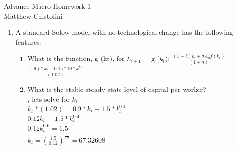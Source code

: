 \documentclass[12pt,oneside,reqno]{amsart}
\begin{document}
\begin{center}
    \Huge{Advance Macro Homework 1}\\
    \large{Matthew Chistolini}
\end{center}
\vspace{-.3cm}
\begin{enumerate}
    \item A standard Solow model with no technological change has the following features:
    \begin{enumerate}
        \item What is the function, g (kt), for $k_{t+1}$ = g ($k_t$): $\frac{(1-\delta)k_t+\sigma A_0 f(k_t)}{(1+n)}$ = $\frac{(.9)*k_t+0.15*10 *k_t^{0.4}}{(1.02)}$
        \item What is the stable steady state level of capital per worker? \\
        $ $, lets solve for $k_t$ \\
        $k_t*(1.02) = 0.9*k_t+1.5*k_t^{0.4}$\\
        $0.12k_t=1.5*k_t^{0.4}$\\
        $0.12k_t^{0.6}=1.5$\\
        $k_t=(\frac{1.5}{0.12})^{\frac{1}{0.6}}=67.32608$
        

\end{enumerate}
\end{enumerate}
\end{document}
